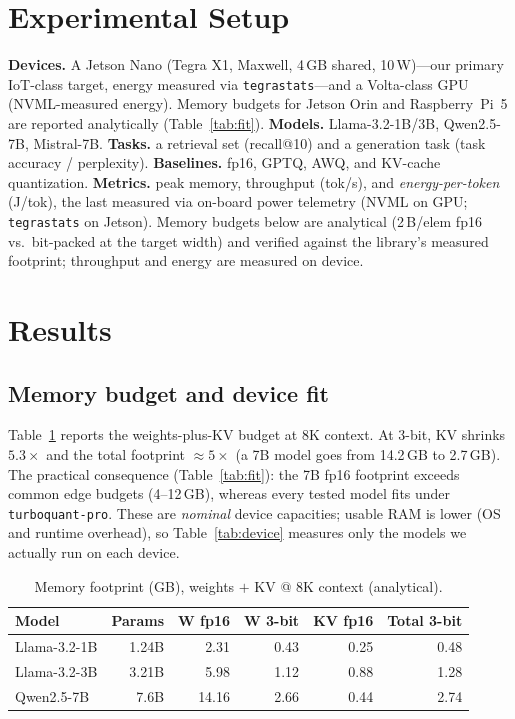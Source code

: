 \documentclass[10pt,conference,compsoc]{IEEEtran}
\begin{document}
\section{Experimental Setup}
\textbf{Devices.} A Jetson Nano (Tegra X1, Maxwell, 4\,GB shared, 10\,W)---our
primary IoT-class target, energy measured via \texttt{tegrastats}---and a
Volta-class GPU (NVML-measured energy). Memory budgets for Jetson Orin and
Raspberry~Pi~5 are reported analytically (Table~\ref{tab:fit}).
\textbf{Models.} Llama-3.2-1B/3B, Qwen2.5-7B, Mistral-7B.
\textbf{Tasks.} a retrieval set (recall@10) and a generation task
(task accuracy / perplexity). \textbf{Baselines.} fp16, GPTQ, AWQ, and KV-cache
quantization. \textbf{Metrics.} peak memory, throughput (tok/s), and
\emph{energy-per-token} (J/tok), the last measured via on-board power telemetry
(NVML on GPU; \texttt{tegrastats} on Jetson). Memory budgets below are analytical
(2\,B/elem fp16 vs.\ bit-packed at the target width) and verified against the
library's measured footprint; throughput and energy are measured on device.

\section{Results}

\subsection{Memory budget and device fit}
Table~\ref{tab:budget} reports the weights-plus-KV budget at 8K context. At
3-bit, KV shrinks $5.3\times$ and the total footprint $\approx 5\times$ (a 7B
model goes from 14.2\,GB to 2.7\,GB). The practical consequence
(Table~\ref{tab:fit}): the 7B fp16 footprint exceeds common edge budgets
(4--12\,GB), whereas every tested model fits under \texttt{turboquant-pro}. These
are \emph{nominal} device capacities; usable RAM is lower (OS and runtime
overhead), so Table~\ref{tab:device} measures only the models we actually run on
each device.

\begin{table}[t]
\caption{Memory footprint (GB), weights $+$ KV @ 8K context (analytical).}
\label{tab:budget}
\centering
\footnotesize
\begin{tabular}{lrrrrr}
\toprule
Model & Params & W fp16 & W 3-bit & KV fp16 & Total 3-bit \\
\midrule
Llama-3.2-1B & 1.24B & 2.31 & 0.43 & 0.25 & 0.48 \\
Llama-3.2-3B & 3.21B & 5.98 & 1.12 & 0.88 & 1.28 \\
Qwen2.5-7B   & 7.6B  & 14.16 & 2.66 & 0.44 & 2.74 \\
\bottomrule
\end{tabular}
\end{table}
\end{document}
